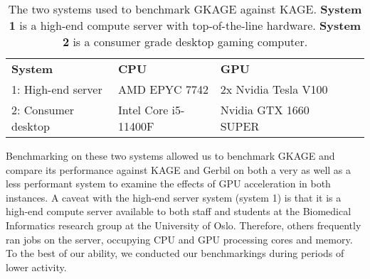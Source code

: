 \vspace{1em}
\begin{table}[H]
\begin{center}
\begin{tabular}{lllll}
\multicolumn{1}{l|}{\textbf{System}} & \multicolumn{1}{l}{\textbf{CPU}}                  & \multicolumn{1}{l}{\textbf{GPU}}                   &  \\ \cline{1-3}
\multicolumn{1}{l|}{1: High-end server} & \multicolumn{1}{l}{AMD EPYC 7742}        & \multicolumn{1}{l}{2x Nvidia Tesla V100}     &  \\ 
\multicolumn{1}{l|}{2: Consumer desktop} & \multicolumn{1}{l}{Intel Core i5-11400F} & \multicolumn{1}{l}{Nvidia GTX 1660 SUPER} &  \\
\end{tabular}
\end{center}
\caption{
  The two systems used to benchmark GKAGE against KAGE.
  \textbf{System 1} is a high-end compute server with top-of-the-line hardware.
  \textbf{System 2} is a consumer grade desktop gaming computer.
}
\label{methods:benchmarking_setup:systems:tables:systems}
\end{table}

Benchmarking on these two systems allowed us to benchmark GKAGE and compare its performance against KAGE and Gerbil on both a very as well as a less performant system to examine the effects of GPU acceleration in both instances.
A caveat with the high-end server system (system 1) is that it is a high-end compute server available to both staff and students at the Biomedical Informatics research group at the University of Oslo.
Therefore, others frequently ran jobs on the server, occupying CPU and GPU processing cores and memory.
To the best of our ability, we conducted our benchmarkings during periods of lower activity.
